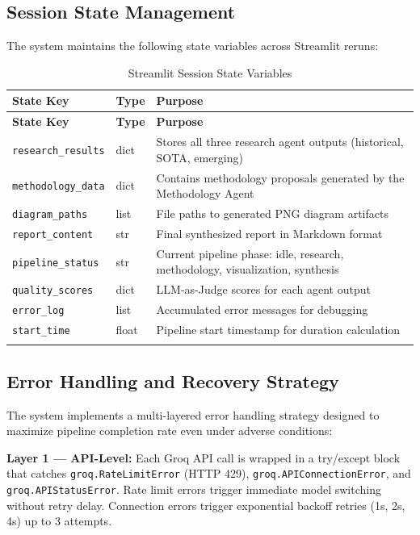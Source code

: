 \documentclass[a4paper,12pt,openany]{report}
\begin{document}
\subsection{Session State Management}

The system maintains the following state variables across Streamlit reruns:

\begin{longtable}{|p{3cm}|l|p{8.5cm}|}
\hline
\textbf{State Key} & \textbf{Type} & \textbf{Purpose} \\
\hline
\endfirsthead
\hline
\textbf{State Key} & \textbf{Type} & \textbf{Purpose} \\
\hline
\endhead
\hline
\endfoot
\texttt{research\_results} & dict & Stores all three research agent outputs (historical, SOTA, emerging) \\
\hline
\texttt{methodology\_data} & dict & Contains methodology proposals generated by the Methodology Agent \\
\hline
\texttt{diagram\_paths} & list & File paths to generated PNG diagram artifacts \\
\hline
\texttt{report\_content} & str & Final synthesized report in Markdown format \\
\hline
\texttt{pipeline\_status} & str & Current pipeline phase: idle, research, methodology, visualization, synthesis \\
\hline
\texttt{quality\_scores} & dict & LLM-as-Judge scores for each agent output \\
\hline
\texttt{error\_log} & list & Accumulated error messages for debugging \\
\hline
\texttt{start\_time} & float & Pipeline start timestamp for duration calculation \\
\hline

\caption{Streamlit Session State Variables}
\label{tab:session_state}
\end{longtable}

\subsection{Error Handling and Recovery Strategy}

The system implements a multi-layered error handling strategy designed to maximize pipeline completion rate even under adverse conditions:

\textbf{Layer 1 --- API-Level:} Each Groq API call is wrapped in a try/except block that catches \texttt{groq.RateLimitError} (HTTP 429), \texttt{groq.APIConnectionError}, and \texttt{groq.APIStatusError}. Rate limit errors trigger immediate model switching without retry delay. Connection errors trigger exponential backoff retries (1s, 2s, 4s) up to 3 attempts.
\end{document}
